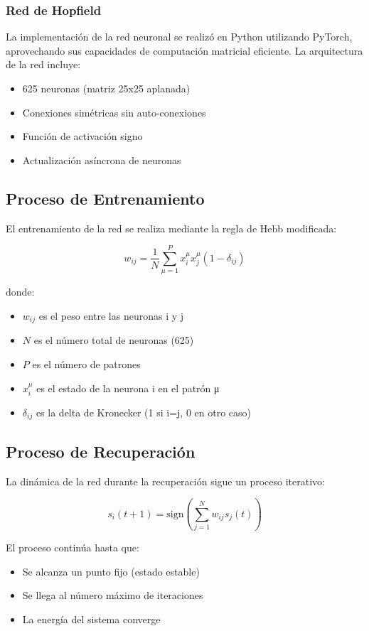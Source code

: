 \documentclass{article}
\begin{document}
\subsubsection{Red de Hopfield}
La implementación de la red neuronal se realizó en Python utilizando PyTorch, aprovechando sus capacidades de computación matricial eficiente. La arquitectura de la red incluye:

\begin{itemize}
    \item 625 neuronas (matriz 25x25 aplanada)
    \item Conexiones simétricas sin auto-conexiones
    \item Función de activación signo
    \item Actualización asíncrona de neuronas
\end{itemize}

\subsection{Proceso de Entrenamiento}
El entrenamiento de la red se realiza mediante la regla de Hebb modificada:

\[ w_{ij} = \frac{1}{N} \sum_{\mu=1}^{P} x_i^{\mu} x_j^{\mu} (1 - \delta_{ij}) \]

donde:
\begin{itemize}
    \item \(w_{ij}\) es el peso entre las neuronas i y j
    \item \(N\) es el número total de neuronas (625)
    \item \(P\) es el número de patrones
    \item \(x_i^{\mu}\) es el estado de la neurona i en el patrón μ
    \item \(\delta_{ij}\) es la delta de Kronecker (1 si i=j, 0 en otro caso)
\end{itemize}

\subsection{Proceso de Recuperación}
La dinámica de la red durante la recuperación sigue un proceso iterativo:

\[ s_i(t+1) = \text{sign}\left(\sum_{j=1}^{N} w_{ij} s_j(t)\right) \]

El proceso continúa hasta que:
\begin{itemize}
    \item Se alcanza un punto fijo (estado estable)
    \item Se llega al número máximo de iteraciones
    \item La energía del sistema converge
\end{itemize}
\end{document}
